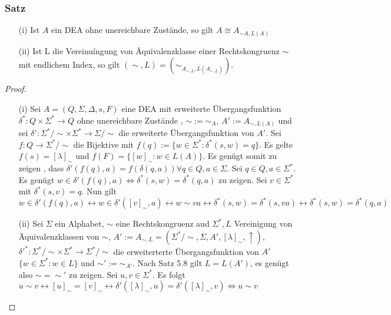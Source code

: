     \subsubsection*{Satz}
    \begin{itemize}
        \item [(i)] Ist $A$ ein DEA ohne unereichbare Zustände, so gilt $A \cong A_{\sim A, L(A)}$
        \item [(ii)] Ist L die Vereinuíngung von Äquivalenzklasse einer Rechtskongruenz $\sim$ mit endlichem Index, so gilt $(\sim, L) = (\sim_{A_{\sim, L}, L(A_{\sim, L})})$.
      \end{itemize}
    
      \begin{proof}
        \begin{itemize}
          \item [(i)] Sei $A = (Q, \Sigma, \Delta, s, F)$ eine DEA mit erweiterte Übergangsfunktion $\delta^* : Q \times \Sigma^* \to Q$ ohne unereichbare Zustände , $\sim := \sim_A$, $A' := A_{\sim, L(A)}$ und sei $\delta' : \Sigma^* / \sim \times \Sigma^* \to \Sigma/\sim$ die erweiterte Übergangsfunktion von $A'$. Sei $f : Q \to \Sigma^* / \sim$ die Bijektive mit $f(q) := \{ w \in \Sigma^* : \delta^*(s,w) = q\}$. Es gelte $f(s) = [\lambda]_{\sim}$ und $f(F) = \{[w]_{\sim} : w \in L(A)\}$. Es genügt somit zu zeigen , dass $\delta'(f(q), a) = f(\delta(q,a)) \forall q \in Q, a \in \Sigma$. Sei $q \in Q, a \in \Sigma^*$. Es genügt $w \in \delta' (f(q), a) \Leftrightarrow \delta^*(s,w) = \delta^*(q, a)$ zu zeigen. Sei $v \in \Sigma^*$ mit $\delta^*(s,v) = q$. Nun gilt $w \in \delta'(f(q), a) \leftrightarrow w \in \delta'([v]_{\sim}, a) \leftrightarrow w \sim va \leftrightarrow \delta^*(s,w) = \delta^*(s, va) \leftrightarrow \delta^*(s,w) = \delta^*(q,a)$
          \item [(ii)] Sei $\Sigma$ ein Alphabet, $\sim$ eine Rechtskongruenz aud $\Sigma^*, L$ Vereinigung von Äquivalenzklassen von $\sim$, $A' := A_{\sim, L} = (\Sigma^*/\sim, \Sigma, A', [\lambda]_{\sim}, \uparrow)$, $\delta'^* : \Sigma^*/\sim \times \Sigma^* \to \Sigma^*/\sim$ die erweiterterte Übergangsfunktion von $A'$ $\{w \in \Sigma^* : w \in L \}$ und $\sim' := \sim_{A'}$. Nach Satz 5.8 gilt $L = L(A')$, es genügt also $\sim = \sim'$ zu zeigen. Sei $u, v \in \Sigma^*$. Es folgt $u \sim v \leftrightarrow 
          [u]_{\sim} = [v]_{\sim} \leftrightarrow \delta'([\lambda]_\sim,u)=\delta'([\lambda]_\sim,v)\Leftrightarrow u\sim v$
        \end{itemize}
      \end{proof}
